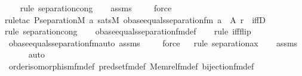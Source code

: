 \begin{isabellebody}
\ \ \ \isamarkupfalse%
{\isacharparenleft}{\kern0pt}rule\ separation{\isacharunderscore}{\kern0pt}cong{\isacharparenright}{\kern0pt}\isanewline
\ \ \isamarkupfalse%
\ assms\isanewline
\ \ \ \isamarkupfalse%
\ force\isanewline
\ \ \isamarkupfalse%
{\isacharparenleft}{\kern0pt}rule{\isacharunderscore}{\kern0pt}tac\ P{\isacharequal}{\kern0pt}{\isachardoublequoteopen}separation{\isacharparenleft}{\kern0pt}{\isacharhash}{\kern0pt}{\isacharhash}{\kern0pt}M{\isacharcomma}{\kern0pt}\ {\isasymlambda}a{\isachardot}{\kern0pt}\ sats{\isacharparenleft}{\kern0pt}M{\isacharcomma}{\kern0pt}\ obase{\isacharunderscore}{\kern0pt}equals{\isacharunderscore}{\kern0pt}separation{\isacharunderscore}{\kern0pt}fm{\isacharcomma}{\kern0pt}\ {\isacharbrackleft}{\kern0pt}a{\isacharbrackright}{\kern0pt}\ {\isacharat}{\kern0pt}\ {\isacharbrackleft}{\kern0pt}A{\isacharcomma}{\kern0pt}\ r{\isacharbrackright}{\kern0pt}{\isacharparenright}{\kern0pt}{\isacharparenright}{\kern0pt}{\isachardoublequoteclose}\ \ iffD{}{\isacharparenright}{\kern0pt}\isanewline
\ \ \isamarkupfalse%
{\isacharparenleft}{\kern0pt}rule\ separation{\isacharunderscore}{\kern0pt}cong{\isacharparenright}{\kern0pt}\isanewline
\ \ \isamarkupfalse%
\ obase{\isacharunderscore}{\kern0pt}equals{\isacharunderscore}{\kern0pt}separation{\isacharunderscore}{\kern0pt}fm{\isacharunderscore}{\kern0pt}def\isanewline
\ \ \ \isamarkupfalse%
{\isacharparenleft}{\kern0pt}rule\ iff{\isacharunderscore}{\kern0pt}flip{\isacharparenright}{\kern0pt}\isanewline
\ \ \isamarkupfalse%
\ obase{\isacharunderscore}{\kern0pt}equals{\isacharunderscore}{\kern0pt}separation{\isacharunderscore}{\kern0pt}fm{\isacharunderscore}{\kern0pt}auto\ assms\isanewline
\ \ \ \isamarkupfalse%
\ force\isanewline
\ \ \isamarkupfalse%
{\isacharparenleft}{\kern0pt}rule\ separation{\isacharunderscore}{\kern0pt}ax{\isacharparenright}{\kern0pt}\isanewline
\ \ \isamarkupfalse%
\ assms\isanewline
\ \ \ \ \isamarkupfalse%
\ auto{\isacharbrackleft}{\kern0pt}{}{\isacharbrackright}{\kern0pt}\isanewline
\ \ \isamarkupfalse%
\ order{\isacharunderscore}{\kern0pt}isomorphism{\isacharunderscore}{\kern0pt}fm{\isacharunderscore}{\kern0pt}def\ pred{\isacharunderscore}{\kern0pt}set{\isacharunderscore}{\kern0pt}fm{\isacharunderscore}{\kern0pt}def\ Memrel{\isacharunderscore}{\kern0pt}fm{\isacharunderscore}{\kern0pt}def\ bijection{\isacharunderscore}{\kern0pt}fm{\isacharunderscore}{\kern0pt}def\isanewline

\end{isabellebody}
